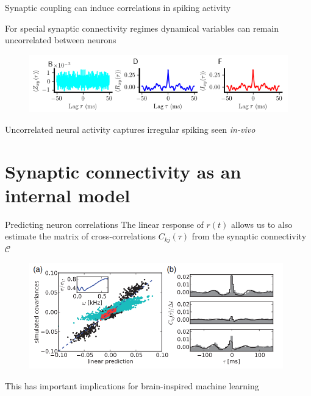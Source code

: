 \documentclass[aspectratio=169]{beamer}
\begin{document}
\begin{frame}{Synaptic coupling can induce correlations in spiking activity}

For special synaptic connectivity regimes dynamical variables can remain uncorrelated between neurons

\begin{figure}
\centering
\includegraphics[width=140mm]{figure-12-1}
\end{figure}

Uncorrelated neural activity captures irregular spiking seen \emph{in-vivo}

\end{frame}

\section{Synaptic connectivity as an internal model}
\begin{frame}{Predicting neuron correlations}
The linear response of $r(t)$ allows us to also estimate the matrix of cross-correlations $C_{kj}(\tau)$
from the synaptic connectivity $\mathcal{C}$
\begin{figure}
\centering
\includegraphics[width=110mm]{figure-20}
\end{figure}

This has important implications for brain-inspired machine learning

\end{frame}
\end{document}

